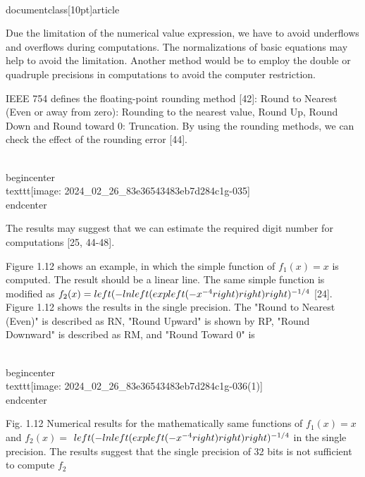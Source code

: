 \\documentclass[10pt]{article}
\begin{document}
Due the limitation of the numerical value expression, we have to avoid underflows and overflows during computations. The normalizations of basic equations may help to avoid the limitation. Another method would be to employ the double or quadruple precisions in computations to avoid the computer restriction.

IEEE 754 defines the floating-point rounding method [42]: Round to Nearest (Even or away from zero): Rounding to the nearest value, Round Up, Round Down and Round toward 0: Truncation. By using the rounding methods, we can check the effect of the rounding error [44].

\\begin{center}
\\texttt{[image: 2024\_02\_26\_83e36543483eb7d284c1g-035]}
\\end{center}

The results may suggest that we can estimate the required digit number for computations [25, 44-48].

Figure 1.12 shows an example, in which the simple function of $f_{1}(x)=x$ is computed. The result should be a linear line. The same simple function is modified as $f_{2}(x)=\\left(-\\ln \\left(\\exp \\left(-x^{-4}\\right)\\right)\\right)^{-1 / 4}$ [24]. Figure 1.12 shows the results in the single precision. The "Round to Nearest (Even)" is described as RN, "Round Upward" is shown by RP, "Round Downward" is described as RM, and "Round Toward 0" is

\\begin{center}
\\texttt{[image: 2024\_02\_26\_83e36543483eb7d284c1g-036(1)]}
\\end{center}

Fig. 1.12 Numerical results for the mathematically same functions of $f_{1}(x)=x$ and $f_{2}(x)=$ $\\left(-\\ln \\left(\\exp \\left(-x^{-4}\\right)\\right)\\right)^{-1 / 4}$ in the single precision. The results suggest that the single precision of 32 bits is not sufficient to compute $f_{2}$
\end{document}

